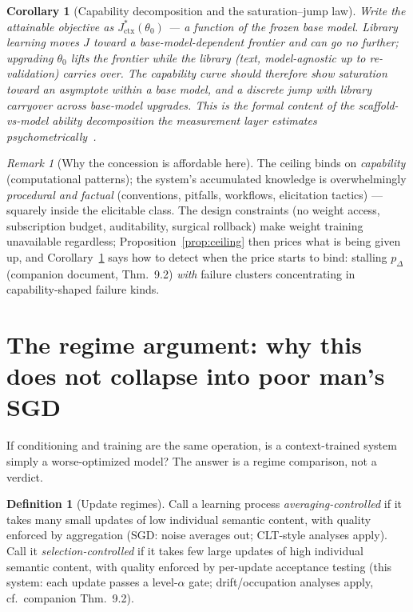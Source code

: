 \documentclass[11pt]{article}
\theoremstyle{plain}
\newtheorem{corollary}[theorem]{Corollary}
\theoremstyle{definition}
\newtheorem{definition}[theorem]{Definition}
\theoremstyle{remark}
\newtheorem{remark}[theorem]{Remark}
\begin{document}
\begin{corollary}[Capability decomposition and the saturation--jump law]
\label{cor:saturation}
Write the attainable objective as $J^\ast_{\mathrm{ctx}}(\theta_0)$ ---
a function of the frozen base model. Library learning moves $J$ toward a
\emph{base-model-dependent frontier} and can go no further; upgrading
$\theta_0$ lifts the frontier while the library (text, model-agnostic up to
re-validation) carries over. The capability curve should therefore show
\emph{saturation toward an asymptote within a base model, and a discrete
jump with library carryover across base-model upgrades}. This is the formal
content of the scaffold-vs-model ability decomposition the measurement layer
estimates psychometrically~\cite{agentpsych}.
\end{corollary}

\begin{remark}[Why the concession is affordable here]
The ceiling binds on \emph{capability} (computational patterns); the
system's accumulated knowledge is overwhelmingly \emph{procedural and
factual} (conventions, pitfalls, workflows, elicitation tactics) --- squarely
inside the elicitable class. The design constraints (no weight access,
subscription budget, auditability, surgical rollback) make weight training
unavailable regardless; Proposition~\ref{prop:ceiling} then prices what is
being given up, and Corollary~\ref{cor:saturation} says how to detect when
the price starts to bind: stalling $p_\Delta$ (companion document,
Thm.~9.2) \emph{with} failure clusters concentrating in
capability-shaped failure kinds.
\end{remark}

\section{The regime argument: why this does not collapse into poor man's
SGD}\label{sec:regime}

If conditioning and training are the same operation, is a context-trained
system simply a worse-optimized model? The answer is a regime comparison,
not a verdict.

\begin{definition}[Update regimes]
Call a learning process \emph{averaging-controlled} if it takes many small
updates of low individual semantic content, with quality enforced by
aggregation (SGD: noise averages out; CLT-style analyses apply). Call it
\emph{selection-controlled} if it takes few large updates of high individual
semantic content, with quality enforced by per-update acceptance testing
(this system: each update passes a level-$\alpha$ gate; drift/occupation
analyses apply, cf.\ companion Thm.~9.2).
\end{definition}
\end{document}
